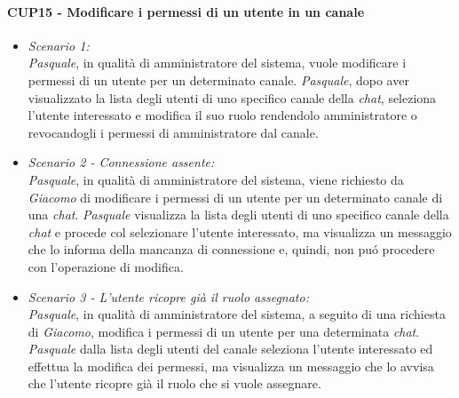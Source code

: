 \paragraph{CUP15 - Modificare i permessi di un utente in un canale \\}
\begin{itemize}
	\item \textit{Scenario 1:\\}
	\textit{Pasquale}, in qualità di amministratore del sistema, vuole modificare i permessi di un utente per un determinato canale. 
	\textit{Pasquale}, dopo aver visualizzato la lista degli utenti di uno specifico canale della \textit{chat}, seleziona  l’utente interessato e modifica il suo ruolo rendendolo amministratore o revocandogli i permessi di amministratore dal canale.\\
	
	\item \textit{Scenario 2 - Connessione assente:\\}
	\textit{Pasquale}, in qualità di amministratore del sistema, viene richiesto da \textit{Giacomo} di modificare i permessi di un utente per un determinato canale di una \textit{chat}.
	\textit{Pasquale} visualizza la lista degli utenti di uno specifico canale della \textit{chat} e procede col selezionare l’utente interessato, ma visualizza un messaggio che lo informa della mancanza di connessione e, quindi, non puó procedere con l’operazione di modifica.\\
	
	\item \textit{Scenario 3 - L'utente ricopre già il ruolo assegnato:\\}
	\textit{Pasquale}, in qualità di amministratore del sistema, a seguito di una richiesta di \textit{Giacomo}, modifica i permessi di un utente per una determinata \textit{chat}.
	\textit{Pasquale} dalla lista degli utenti del canale seleziona l’utente interessato ed effettua la modifica dei permessi, ma visualizza un messaggio che lo avvisa che l’utente ricopre già il ruolo che si vuole assegnare.\\
	
	
\end{itemize}
